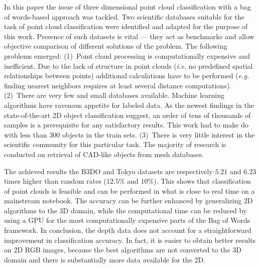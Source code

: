 \documentclass[12pt]{article}
\begin{document}
  In this paper the issue of three dimensional point cloud classification with 
a bag of words-based approach was tackled. Two scientific databases suitable 
for the task of point cloud classification were identified and adapted for the 
purpose of this work. Presence of such datasets is vital --- they act as 
benchmarks and allow objective comparison of different solutions of the 
problem. The following problems emerged: (1)~Point cloud processing is 
computationally expensive and inefficient. Due to the lack of structure in 
point clouds (\textit{i.e.} no predefined spatial relationships between points) 
additional calculations have to be performed (\textit{e.g.} finding nearest 
neighbors requires at least several distance computations). (2)~There are very 
few and small databases available. Machine learning algorithms have ravenous 
appetite for labeled data. As the newest findings in the state-of-the-art 2D 
object classification suggest, an order of tens of thousands of samples is a 
prerequisite for any satisfactory results. This work had to make do with less 
than 300 objects in the train sets. (3)~There is very little interest in the 
scientific community for this particular task. The majority of research is 
conducted on retrieval of CAD-like objects from mesh databases.
  
  The achieved results the B3DO and Tokyo datasets are respectively $5.21$ and 
$6.23$ times higher than random rates ($12.5\%$ and $10\%$). This shows that 
classification of point clouds is feasible and can be performed in what is 
close to real time on a mainstream notebook. The accuracy can be further 
enhanced by generalizing 2D algorithms to the 3D domain, while the 
computational time can be reduced by using a GPU for the most computationally 
expensive parts of the Bag of Words framework. In conclusion, the depth data 
does not account for a straightforward improvement in classification accuracy. 
In fact, it is easier to obtain better results on 2D RGB images, because the 
best algorithms are not converted to the 3D domain and there is substantially 
more data available for the 2D. 


\end{document}
